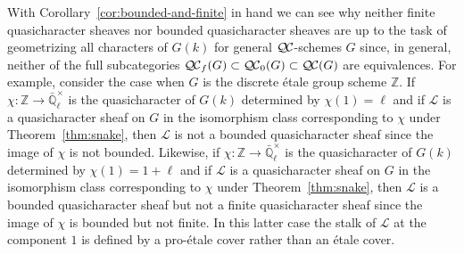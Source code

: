 \documentclass{amsart}
\theoremstyle{plain}
\theoremstyle{definition}
\theoremstyle{remark}
\newcommand{\ZZ}{{\mathbb{Z}}}
\newcommand{\EE}{\mathbb{\bar Q}_\ell}
\newcommand{\Fq}{k}
\newcommand{\EEx}{\EE^\times}
\newcommand{\qcs}[1]{{\mathcal{#1}}}
\newcommand{\QC}{{\mathcal{Q\hskip-0.8pt C}}}
\newcommand{\QCb}{{\QC_0}}
\newcommand{\QCf}{{\QC_f}}
\begin{document}
With Corollary~\ref{cor:bounded-and-finite} in hand
we can see why neither finite quasicharacter sheaves nor bounded quasicharacter sheaves
are up to the task of geometrizing all characters of $G(\Fq)$ for general $\QC$-schemes $G$ since, in general, neither of the full subcategories
$\QCf(G) \subset \QCb(G) \subset \QC(G)$ are equivalences.
For example, consider the case when $G$ is the discrete \'etale group scheme $\ZZ$.
If $\chi : \ZZ \to \EEx$ is the quasicharacter of $G(\Fq)$ determined by $\chi(1) = \ell$
and if $\qcs{L}$ is a quasicharacter sheaf on $G$ in the isomorphism class
corresponding to $\chi$ under Theorem~\ref{thm:snake},
then $\qcs{L}$ is not a bounded quasicharacter sheaf since the image of $\chi$ is not
bounded.
Likewise, if $\chi : \ZZ \to \EEx$ is the quasicharacter of $G(\Fq)$ determined by $\chi(1) = 1+\ell$
and if $\qcs{L}$ is a quasicharacter sheaf on $G$ in the isomorphism class
corresponding to $\chi$ under Theorem~\ref{thm:snake},
then $\qcs{L}$ is a bounded quasicharacter sheaf but not a finite quasicharacter sheaf
since the image of $\chi$ is bounded but not finite.
In this latter case the stalk of $\qcs{L}$ at the component $1$ is defined
by a pro-\'etale cover rather than an \'etale cover.




\end{document}
